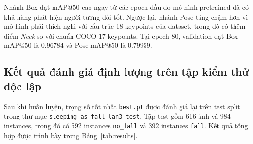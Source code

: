 \documentclass[12pt, a4paper]{article}
\begin{document}
\begin{table}[H]
  \centering
  \caption{Một số mốc kết quả validation trong quá trình train}
  \label{tab:val_progress}
\end{table}

Nhánh Box đạt mAP@50 cao ngay từ các epoch đầu do mô hình pretrained đã có khả năng phát hiện người tương đối tốt.
Ngược lại, nhánh Pose tăng chậm hơn vì mô hình phải thích nghi với cấu trúc 18 keypoints của dataset, trong đó có thêm điểm \textit{Neck} so với chuẩn COCO 17 keypoints.
Tại epoch 80, validation đạt Box mAP@50 là 0.96784 và Pose mAP@50 là 0.79959.

\subsection{Kết quả đánh giá định lượng trên tập kiểm thử độc lập}
\label{subsec:quantitative_evaluation}
Sau khi huấn luyện, trọng số tốt nhất \texttt{best.pt} được đánh giá lại trên test split trong thư mục \texttt{sleeping-as-fall-lan3-test}.
Tập test gồm 616 ảnh và 984 instances, trong đó có 592 instances \texttt{no\_fall} và 392 instances \texttt{fall}.
Kết quả tổng hợp được trình bày trong Bảng~\ref{tab:results}.

\begin{table}[H]
  \centering
  \caption{Kết quả đánh giá định lượng mô hình trên tập dữ liệu kiểm thử độc lập}
  \label{tab:results}
\end{table}
\end{document}
